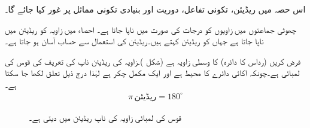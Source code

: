 
اس حصہ میں ریڈیئن، تکونی تفاعل، دوریت اور بنیادی تکونی مماثل پر غور کیا جائے گا۔ 

چھوٹی جماعتوں میں زاویوں کو درجات کی صورت میں ناپا جاتا ہے۔ احصاء میں زاویہ کو ریڈیئن میں ناپا جاتا ہے جہاں  کو  ریڈیئن کہتے ہیں۔ریڈیئن کی استعمال سے حساب آسان ہو جاتا ہے۔

فرض کریں  (رداس  کا دائرہ) کا وسطی زاویہ  ہے (شکل )۔زاویہ  کی ریڈیئن ناپ کی تعریف  کی قوس  کی لمبائی ہے۔چونکہ اکائی دائرے کا محیط   ہے اور ایک مکمل چکر  ہے لہٰذا درج ذیل تعلق لکھا جا سکتا ہے۔
\begin{align*}
\boxed{\pi\,\text{ریڈیئن}=180^{\circ}}
\end{align*}
%
\begin{figure}
\centering
{}
\caption{قوس  کی لمبائی زاویہ  کی ناپ ریڈیئن میں دیتی ہے۔}
\label{شکل_ابتدا_اکائی_دائرہ_ریڈیئن}
\end{figure}

